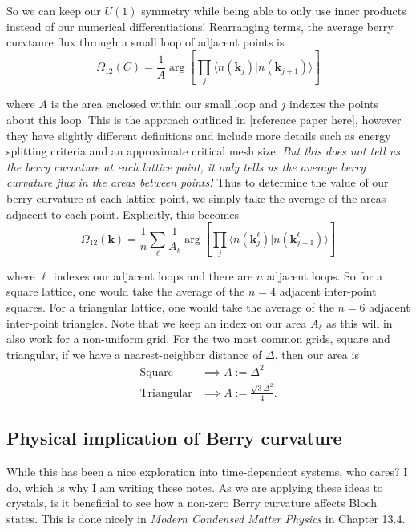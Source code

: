 \documentclass[12pt]{revtex4-2}
\begin{document}
So we can keep our $U(1)$ symmetry while being able to only use inner products instead of our numerical differentiations!  Rearranging terms, the average berry curvtaure flux through a small loop of adjacent points is 
\begin{equation}
    \Omega_{12}(C) = \frac{1}{A} \arg \left[\prod_j \big\langle n(\mathbf{k}_j)| n(\mathbf{k}_{j+1}) \big\rangle \right]
\end{equation}

where $A$ is the area enclosed within our small loop and $j$ indexes the points about this loop. This is the approach outlined in [reference paper here], however they have slightly different definitions and include more details such as energy splitting criteria and an approximate critical mesh size.  \emph{But this does not tell us the berry curvature at each lattice point, it only tells us the average berry curvature flux in the areas between points!}  Thus to determine the value of our berry curvature at each lattice point, we simply take the average of the areas adjacent to each point.  Explicitly, this becomes
\begin{equation}
    \boxed{ \Omega_{12}(\mathbf{k}) = \frac{1}{n} \sum_{\ell} \frac{1}{A_\ell}\arg \left[\prod_j \big\langle n(\mathbf{k}_j^\ell)| n(\mathbf{k}_{j+1}^\ell) \big\rangle \right] }
\end{equation}

where $\ell$ indexes our adjacent loops and there are $n$ adjacent loops.  So for a square lattice, one would take the average of the $n=4$ adjacent inter-point squares.  For a triangular lattice, one would take the average of the $n=6$ adjacent inter-point triangles.  Note that we keep an index on our area $A_\ell$ as this will in also work for a non-uniform grid.  For the two most common grids, square and triangular, if we have a nearest-neighbor distance of $\Delta$, then our area is 
\begin{align}
    \text{Square} &\implies A := \Delta^2 \\
    \text{Triangular} &\implies A := \frac{\sqrt{3}\Delta^2}{4}.
\end{align}

\subsection{Physical implication of Berry curvature}

While this has been a nice exploration into time-dependent systems, who cares?  I do, which is why I am writing these notes.  As we are applying these ideas to crystals, is it beneficial to see how a non-zero Berry curvature affects Bloch states.  This is done nicely in \emph{Modern Condensed Matter Physics} in Chapter 13.4.
\end{document}

